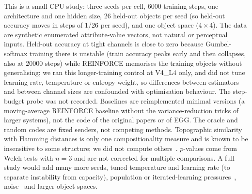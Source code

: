 This is a small CPU study: three seeds per cell, 6000 training steps, one architecture and one hidden size, 26 held-out objects per seed (so held-out accuracy moves in steps of 1/26 per seed), and one object space ($4\times4$). The data are synthetic enumerated attribute-value vectors, not natural or perceptual inputs. Held-out accuracy at tight channels is close to zero because Gumbel-softmax training there is unstable (train accuracy peaks early and then collapses, also at 20000 steps) while REINFORCE memorises the training objects without generalising; we ran this longer-training control at V4\_L4 only, and did not tune learning rate, temperature or entropy weight, so differences between estimators and between channel sizes are confounded with optimisation behaviour. The step-budget probe was not recorded. Baselines are reimplemented minimal versions (a moving-average REINFORCE baseline without the variance-reduction tricks of larger systems), not the code of the original papers or of EGG. The oracle and random codes are fixed senders, not competing methods. Topographic similarity with Hamming distances is only one compositionality measure and is known to be insensitive to some structure; we did not compute others~\cite{korbak2020measuring}. $p$-values come from Welch tests with $n=3$ and are not corrected for multiple comparisons. A full study would add many more seeds, tuned temperature and learning rate (to separate instability from capacity), population or iterated-learning pressures~\cite{ren2020compositional}, noise~\cite{kuciski2021catalytic} and larger object spaces.
